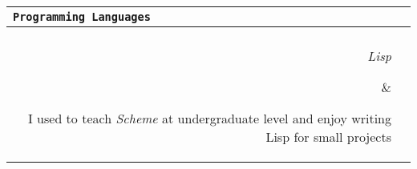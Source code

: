 \documentclass{article}
\newcommand{\cvsectionname}[1]{\multicolumn{2}{l}{\Large \tt #1}\\\hline\\}
\newenvironment{cvsection}[1]{\medskip \begin{tabular}{rl} \cvsectionname{#1}}{\end{tabular}}
\newcommand{\cvline}[2]{\parbox[t]{2.3cm}{\sl  \hfill #1} & \parbox[t]{14cm}{ #2 \hfill}\\\vspace{4pt}}
\newcommand{\cvtechnicalline}[2]{\parbox[t]{2.3cm}{\sl #1} & \parbox[t]{14cm}{ #2 \hfill}\\\vspace{4pt}}
\newcommand{\cvlanguageline}[2]{\parbox[t]{2.48cm}{\sl #1} & \parbox[t]{14cm}{ #2 \hfill}\\\vspace{4pt}}
\begin{document}
%
%
%




\begin{cvsection}{Programming Languages} 
\cvlanguageline{Lisp} {I used to teach {\em Scheme} at undergraduate level and enjoy writing Lisp for small projects} %

\cvlanguageline{Smalltalk} {For the last three years I have been working with {\em Smalltalk} and I came to appreciate the flexibility of the language and it's simplicity. At the university of lugano I taught smalltalk during the Programming Fundamentals course.}

\cvlanguageline{Java} {During the university years, I wrote a compiler for a simplified version of Pascal and a simplle CRM application. During my 6 months of internship at IBM I developed an Eclipse plugin for visualizing large distributed systems specifications. I supervised a bachelor project implementing a software visualization plugin for the Eclipse IDE.}

\cvlanguageline{Other} {While working as a software developer at Computervoice Systems, I acquired in-depth knowledge of  {\em Visual C++} and MFC. I have taught {\em Pascal} at highschool level. Over the years I worked with many other languages: as Assembly, Prolog, Objective C, Ruby.}
\end{cvsection}
\end{document}
